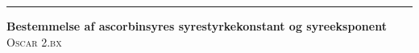 \begin{titlepage} %
	{
        \vspace*{-2cm}
	\raggedleft%
	
	\rule{1pt}{\textheight} %
	\hspace{0.05\textwidth} %
	\parbox[b]{0.75\textwidth}{ %
		
		{\huge \bfseries Bestemmelse af ascorbinsyres syrestyrkekonstant og syreeksponent}\\[2\baselineskip] %
		{\Large\textsc{Oscar 2.bx}} %
		
		\vspace{0.5\textheight} %
		
	}
    }

\end{titlepage}

\pagebreak
